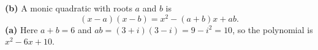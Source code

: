 \textbf{(b)} A monic quadratic with roots $a$ and $b$ is
\[(x-a)(x-b)=\boxed{x^2-(a+b)x+ab}.\]
\textbf{(a)} Here $a+b=6$ and $ab=(3+i)(3-i)=9-i^2=10$, so the polynomial is $\boxed{x^2-6x+10}$.
